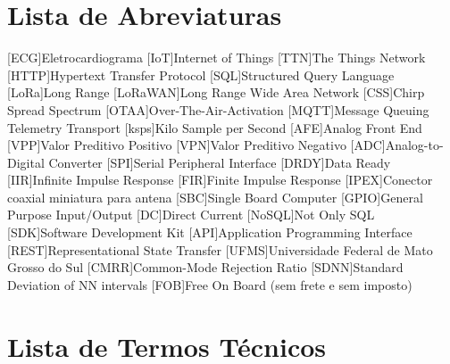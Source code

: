\chapter*{Lista de Abreviaturas}
\begin{acronym}
    [ECG]{Eletrocardiograma}
    [IoT]{Internet of Things}
    [TTN]{The Things Network}
    [HTTP]{Hypertext Transfer Protocol}
    [SQL]{Structured Query Language}
    [LoRa]{Long Range}
    [LoRaWAN]{Long Range Wide Area Network}
    [CSS]{Chirp Spread Spectrum}
    [OTAA]{Over-The-Air-Activation}
    [MQTT]{Message Queuing Telemetry Transport}
    [ksps]{Kilo Sample per Second}
    [AFE]{Analog Front End}
    [VPP]{Valor Preditivo Positivo}
    [VPN]{Valor Preditivo Negativo}
    [ADC]{Analog-to-Digital Converter}
    [SPI]{Serial Peripheral Interface}
    [DRDY]{Data Ready}
    [IIR]{Infinite Impulse Response}
    [FIR]{Finite Impulse Response}
    [IPEX]{Conector coaxial miniatura para antena}
    [SBC]{Single Board Computer}
    [GPIO]{General Purpose Input/Output}
    [DC]{Direct Current}
    [NoSQL]{Not Only SQL}
    [SDK]{Software Development Kit}
    [API]{Application Programming Interface}
    [REST]{Representational State Transfer}
    [UFMS]{Universidade Federal de Mato Grosso do Sul}
    [CMRR]{Common-Mode Rejection Ratio}
    [SDNN]{Standard Deviation of NN intervals}
    [FOB]{Free On Board (sem frete e sem imposto)}

    
\end{acronym}

\chapter*{Lista de Termos Técnicos}

